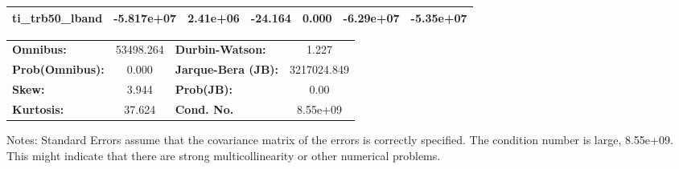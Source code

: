 \begin{center}
\begin{tabular}{lcccccc}
\textbf{ti\_trb50\_lband}   &   -5.817e+07  &     2.41e+06     &   -24.164  &         0.000        &    -6.29e+07    &    -5.35e+07     \\
\bottomrule
\end{tabular}
\begin{tabular}{lclc}
\textbf{Omnibus:}       & 53498.264 & \textbf{  Durbin-Watson:     } &      1.227   \\
\textbf{Prob(Omnibus):} &    0.000  & \textbf{  Jarque-Bera (JB):  } & 3217024.849  \\
\textbf{Skew:}          &    3.944  & \textbf{  Prob(JB):          } &       0.00   \\
\textbf{Kurtosis:}      &   37.624  & \textbf{  Cond. No.          } &   8.55e+09   \\
\bottomrule
\end{tabular}
\end{center}

Notes: \newline
 [1] Standard Errors assume that the covariance matrix of the errors is correctly specified. \newline
 [2] The condition number is large, 8.55e+09. This might indicate that there are \newline
 strong multicollinearity or other numerical problems.


